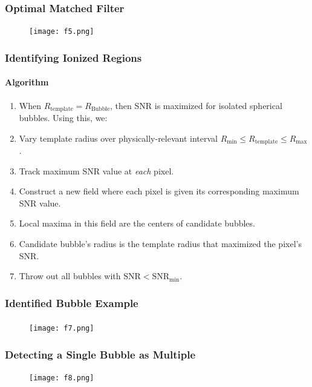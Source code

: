 \documentclass{beamer}
\begin{document}
\begin{frame}
\frametitle{Optimal Matched Filter}
\begin{figure}[h]
  \centering
  \texttt{[image: f5.png]}
\end{figure}
\end{frame}

\begin{frame}
\frametitle{Identifying Ionized Regions}
\framesubtitle{Algorithm}
\begin{enumerate}[1.]
\item[] When $R_{\text{template}} = R_{\text{Bubble}}$, then SNR is maximized for isolated spherical bubbles. Using this, we:
\item Vary template radius over physically-relevant interval $R_{\min} \leq R_{\text{template}} \leq R_{\max}$.
\item Track maximum SNR value at \textit{each} pixel.
\item Construct a new field where each pixel is given its corresponding maximum SNR value.
\item Local maxima in this field are the centers of candidate bubbles.
\item Candidate bubble's radius is the template radius that maximized the pixel's SNR.
\item Throw out all bubbles with $\text{SNR} < \text{SNR}_{\min}$.
\end{enumerate}
\end{frame}


\begin{frame}
\frametitle{Identified Bubble Example}
\framesubtitle{}
\begin{figure}[h]
  \centering
  \texttt{[image: f7.png]}
\end{figure}
\end{frame}

\begin{frame}
\frametitle{Detecting a Single Bubble as Multiple}
\begin{figure}[h]
  \centering
  \texttt{[image: f8.png]}
\end{figure}
\end{frame}
\end{document}
